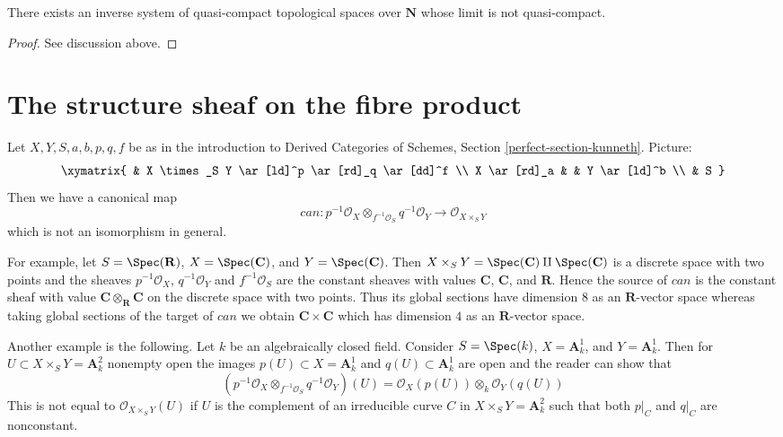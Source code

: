 \begin{lemma}
\label{lemma-lim-not-quasi-compact}
There exists an inverse system of quasi-compact topological spaces
over $\mathbf{N}$ whose limit is not quasi-compact.
\end{lemma}

\begin{proof}
See discussion above.
\end{proof}






\section{The structure sheaf on the fibre product}
\label{section-silly}

\noindent
Let $X, Y, S, a, b, p, q, f$ be as in the introduction to
Derived Categories of Schemes,
Section \ref{perfect-section-kunneth}. Picture:
$$
\xymatrix{
& X \times_S Y \ar[ld]^p \ar[rd]_q \ar[dd]^f \\
X \ar[rd]_a & & Y \ar[ld]^b \\
& S
}
$$
Then we have a canonical map
$$
can :
p^{-1}\mathcal{O}_X \otimes_{f^{-1}\mathcal{O}_S} q^{-1}\mathcal{O}_Y
\longrightarrow
\mathcal{O}_{X \times_S Y}
$$
which is not an isomorphism in general.

\medskip\noindent
For example, let $S = \Spec(\mathbf{R})$, $X = \Spec(\mathbf{C})$, and
$Y = \Spec(\mathbf{C})$. Then
$X \times_S Y = \Spec(\mathbf{C}) \amalg \Spec(\mathbf{C})$
is a discrete space with two points
and the sheaves $p^{-1}\mathcal{O}_X$, $q^{-1}\mathcal{O}_Y$
and $f^{-1}\mathcal{O}_S$ are the constant sheaves with values
$\mathbf{C}$, $\mathbf{C}$, and $\mathbf{R}$.
Hence the source of $can$ is the constant sheaf
with value $\mathbf{C} \otimes_\mathbf{R} \mathbf{C}$
on the discrete space with two points. Thus its global
sections have dimension $8$ as an $\mathbf{R}$-vector space
whereas taking global sections of the target of $can$
we obtain $\mathbf{C} \times \mathbf{C}$
which has dimension $4$ as an $\mathbf{R}$-vector space.

\medskip\noindent
Another example is the following. Let $k$ be an algebraically
closed field. Consider
$S = \Spec(k)$, $X = \mathbf{A}^1_k$, and $Y = \mathbf{A}^1_k$.
Then for $U \subset X \times_S Y = \mathbf{A}^2_k$ nonempty open
the images $p(U) \subset X = \mathbf{A}^1_k$ and $q(U) \subset \mathbf{A}^1_k$
are open and the reader can show that
$$
\left(
p^{-1}\mathcal{O}_X \otimes_{f^{-1}\mathcal{O}_S} q^{-1}\mathcal{O}_Y
\right)(U) = \mathcal{O}_X(p(U)) \otimes_k \mathcal{O}_Y(q(U))
$$
This is not equal to $\mathcal{O}_{X \times_S Y}(U)$
if $U$ is the complement of an irreducible curve $C$ in
$X \times_S Y = \mathbf{A}^2_k$ such that both $p|_C$ and $q|_C$
are nonconstant.

